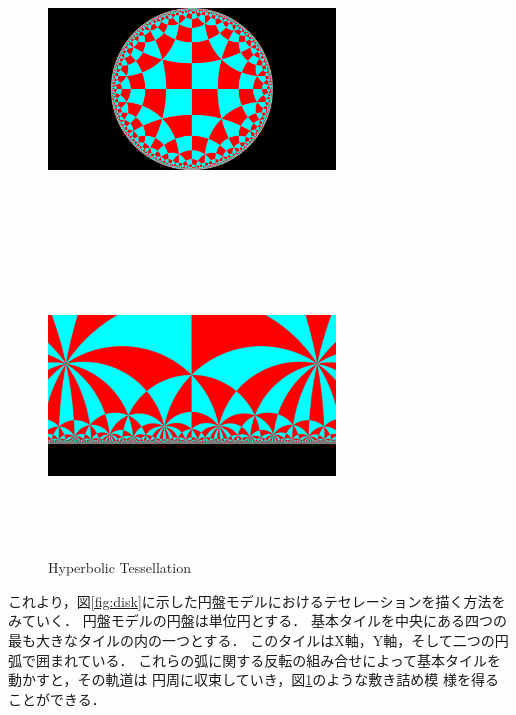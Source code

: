 \begin{figure}[h!tbp]
 \begin{minipage}{0.49\hsize}
  \center
  \includegraphics[width=3in, height=3in,
  keepaspectratio]{../img/tessellation/hyperbolicTessellation.pdf}
  \label{fig:disk}
 \end{minipage}
 \hspace*{\fill}
 \begin{minipage}{0.49\hsize}
  \center
  \includegraphics[width=3in, height=3in, keepaspectratio]{../img/tessellation/upperHalf.pdf}
  \label{fig:upperHalf}
 \end{minipage}
  \caption{Hyperbolic Tessellation}
  \label{fig:hyperbolicTessellation}
\end{figure}

これより，図\ref{fig:disk}に示した円盤モデルにおけるテセレーションを描く方法をみていく．
円盤モデルの円盤は単位円とする．
基本タイルを中央にある四つの最も大きなタイルの内の一つとする．
このタイルはX軸，Y軸，そして二つの円弧で囲まれている．
これらの弧に関する反転の組み合せによって基本タイルを動かすと，その軌道は
円周に収束していき，図\ref{fig:hyperbolicTessellation}のような敷き詰め模
様を得ることができる．

